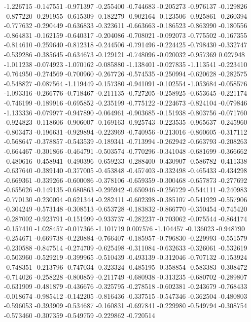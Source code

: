 -1.226715
-0.147551
-0.971397
-0.255400
-0.744683
-0.205273
-0.976137
-0.129826
-0.877220
-0.291955
-0.615309
-0.182279
-0.902164
-0.123506
-0.925861
-0.260394
-0.777632
-0.290449
-0.636833
-0.323611
-0.663663
-0.186523
-0.863990
-0.180556
-0.864831
-0.162159
-0.640317
-0.204086
-0.708021
-0.092073
-0.775502
-0.167355
-0.814610
-0.259640
-0.812318
-0.244506
-0.791496
-0.224425
-0.798430
-0.332747
-0.539286
-0.385645
-0.634673
-0.129121
-0.748096
-0.020032
-0.957369
0.027948
-1.011238
-0.074923
-1.070162
-0.085880
-1.138401
-0.027835
-1.113541
-0.223410
-0.764950
-0.274569
-0.700960
-0.267726
-0.574535
-0.250994
-0.620628
-0.282575
-0.548827
-0.087564
-1.119449
-0.157380
-0.941091
-0.102554
-1.053684
-0.058576
-1.093316
-0.266776
-0.718467
-0.211135
-0.727205
-0.258925
-0.653645
-0.221174
-0.746199
-0.189916
-0.695852
-0.235199
-0.775122
-0.224673
-0.824104
-0.079846
-1.133336
-0.079977
-0.947890
-0.064961
-0.903685
-0.151938
-0.803756
-0.071760
-0.924823
-0.118606
-0.906007
-0.169163
-0.925743
-0.223535
-0.965637
-0.245960
-0.803473
-0.196631
-0.929894
-0.223969
-0.740956
-0.213016
-0.860605
-0.317112
-0.568647
-0.378857
-0.543539
-0.189341
-0.713994
-0.262942
-0.663793
-0.208263
-0.664467
-0.301866
-0.464791
-0.503574
-0.770296
-0.341048
-0.681699
-0.366662
-0.480616
-0.458941
-0.490396
-0.659233
-0.288400
-0.430907
-0.586782
-0.411338
-0.637640
-0.389140
-0.377005
-0.453848
-0.457403
-0.332498
-0.465433
-0.434298
-0.669361
-0.339266
-0.600086
-0.378106
-0.659359
-0.300468
-0.657873
-0.277692
-0.655626
-0.149135
-0.680863
-0.295942
-0.650946
-0.256729
-0.544111
-0.240983
-0.770130
-0.230094
-0.621344
-0.282411
-0.602398
-0.385107
-0.541929
-0.557906
-0.304249
-0.573148
-0.308513
-0.653728
-0.183832
-0.866770
-0.350454
-0.745420
-0.287002
-0.923791
-0.151999
-0.933737
-0.282237
-0.703062
-0.075544
-0.864174
-0.157410
-1.028457
-0.017366
-1.101719
0.007576
-1.104457
-0.136023
-0.948790
-0.254671
-0.669738
-0.220884
-0.766407
-0.185957
-0.796830
-0.229993
-0.551579
-0.230588
-0.847514
-0.274709
-0.625498
-0.311084
-0.632633
-0.326061
-0.532619
-0.503960
-0.529219
-0.399965
-0.510439
-0.493139
-0.312046
-0.707132
-0.153924
-0.748351
-0.213796
-0.747034
-0.323324
-0.485195
-0.358854
-0.583383
-0.308472
-0.714026
-0.258228
-0.800859
-0.211749
-0.680938
-0.313235
-0.680702
-0.289807
-0.631909
-0.481879
-0.436676
-0.325795
-0.278518
-0.602381
-0.243679
-0.768433
-0.018674
-0.985412
-0.142205
-0.816436
-0.337515
-0.547346
-0.362504
-0.480803
-0.596053
-0.393909
-0.534687
-0.160831
-0.697841
-0.229980
-0.549794
-0.308754
-0.573460
-0.307359
-0.549759
-0.229862
-0.720514
